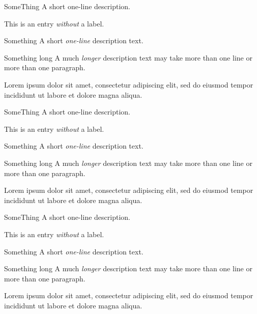 \documentclass{article}
\newlength{\descitemwd}
\begin{document}
\begin{enumext}[label={},labelwidth=\descitemwd,font=\bfseries,noitemsep,topsep=3pt]
  \item[SomeThing] A short one-line description.
  \item[] This is an entry \emph{without} a label.
  \item[Something] A short \emph{one-line} description text.
  \item[Something long] A much \emph{longer} description text may take
    more than one line or more than one paragraph.

    Lorem ipsum dolor sit amet, consectetur adipiscing elit, sed do eiusmod
    tempor incididunt ut labore et dolore magna aliqua.
\end{enumext}

\begin{enumext*}[label={},labelwidth=\descitemwd,font=\bfseries,noitemsep,topsep=3pt]
  \item[SomeThing] A short one-line description.
  \item[] This is an entry \emph{without} a label.
  \item[Something] A short \emph{one-line} description text.
  \item[Something long] A much \emph{longer} description text may take
    more than one line or more than one paragraph.

    Lorem ipsum dolor sit amet, consectetur adipiscing elit, sed do eiusmod
    tempor incididunt ut labore et dolore magna aliqua.
\end{enumext*}

\begin{enumext}[label={},labelwidth=\descitemwd,list-indent=0pt,font=\bfseries,noitemsep,topsep=3pt]
  \item[SomeThing] A short one-line description.
  \item[] This is an entry \emph{without} a label.
  \item[Something] A short \emph{one-line} description text.
  \item[Something long] A much \emph{longer} description text may take
    more than one line or more than one paragraph.

    Lorem ipsum dolor sit amet, consectetur adipiscing elit, sed do eiusmod
    tempor incididunt ut labore et dolore magna aliqua.
\end{enumext}
\end{document}
